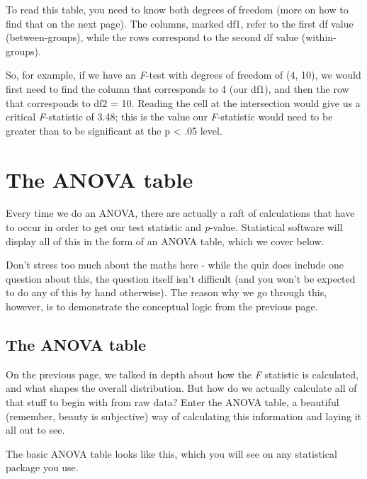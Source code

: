 \documentclass[
]{book}
\begin{document}
To read this table, you need to know both degrees of freedom (more on
how to find that on the next page). The columns, marked df1, refer to
the first df value (between-groups), while the rows correspond to the
second df value (within-groups).

So, for example, if we have an \emph{F}-test with degrees of freedom of (4,
10), we would first need to find the column that corresponds to 4 (our
df1), and then the row that corresponds to df2 = 10. Reading the cell at
the intersection would give us a critical \emph{F}-statistic of 3.48; this is
the value our \emph{F}-statistic would need to be greater than to be
significant at the p \textless{} .05 level.

\hypertarget{the-anova-table}{%
\section{The ANOVA table}\label{the-anova-table}}

Every time we do an ANOVA, there are actually a raft of calculations
that have to occur in order to get our test statistic and \emph{p}-value.
Statistical software will display all of this in the form of an ANOVA
table, which we cover below.

Don't stress too much about the maths here - while the quiz does include
one question about this, the question itself isn't difficult (and you
won't be expected to do any of this by hand otherwise). The reason why
we go through this, however, is to demonstrate the conceptual logic from
the previous page.

\hypertarget{the-anova-table-1}{%
\subsection{The ANOVA table}\label{the-anova-table-1}}

On the previous page, we talked in depth about how the \emph{F} statistic is
calculated, and what shapes the overall distribution. But how do we
actually calculate all of that stuff to begin with from raw data? Enter
the ANOVA table, a beautiful (remember, beauty is subjective) way of
calculating this information and laying it all out to see.

The basic ANOVA table looks like this, which you will see on any
statistical package you use.
\end{document}
